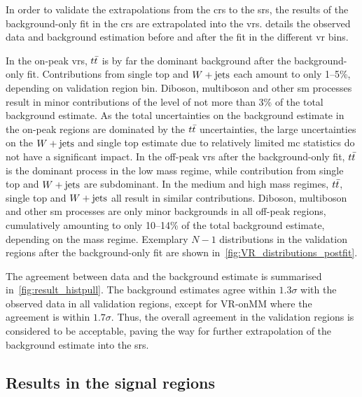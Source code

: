 

In order to validate the extrapolations from the \glspl{cr} to the \glspl{sr}, the results of the background-only fit in the \glspl{cr} are extrapolated into the \glspl{vr}.  details the observed data and background estimation before and after the fit in the different \gls{vr} bins. 

In the on-peak \glspl{vr}, $t\bar{t}$ is by far the dominant background after the background-only fit. Contributions from single top and $W+\mathrm{jets}$ each amount to only 1--5\%, depending on validation region bin. Diboson, multiboson and other \gls{sm} processes result in minor contributions of the level of not more than 3\% of the total background estimate. As the total uncertainties on the background estimate in the on-peak regions are dominated by the $t\bar{t}$ uncertainties, the large uncertainties on the $W+\mathrm{jets}$ and single top estimate due to relatively limited \gls{mc} statistics do not have a significant impact. 
In the off-peak \glspl{vr} after the background-only fit, $t\bar{t}$ is the dominant process in the low mass regime, while contribution from single top and $W+\mathrm{jets}$ are subdominant. In the medium and high mass regimes, $t\bar{t}$, single top and $W+\mathrm{jets}$ all result in similar contributions. Diboson, multiboson and other \gls{sm} processes are only minor backgrounds in all off-peak regions, cumulatively amounting to only 10--14\% of the total background estimate, depending on the mass regime.
Exemplary $N-1$ distributions in the validation regions after the background-only fit are shown in~\cref{fig:VR_distributions_postfit}.

The agreement between data and the background estimate is summarised in~\cref{fig:result_histpull}.  The background estimates agree within $1.3\sigma$ with the observed data in all validation regions, except for VR-onMM where the agreement is within $1.7\sigma$. Thus, the overall agreement in the validation regions is considered to be acceptable, paving the way for further extrapolation of the background estimate into the \glspl{sr}.

\subsection{Results in the signal regions}

